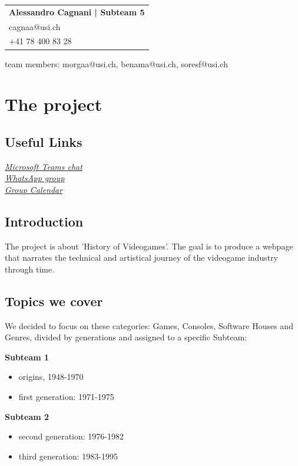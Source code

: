 \documentclass[a4paper,10pt]{article}
\newcommand{\idcard}[3]{
    \vspace{-0.3cm}
    \begin{table}[h!]
     \begin{tabular}{|l|}
        \hline
        \textbf{#1} \\
        #2 \\
        #3\\
        \hline
     \end{tabular}
    \end{table}
    \vspace{-0.3cm}
}
\newcommand{\link}[2]{
    \href{#2}{\textit{\underline{#1}}}\\
}
\begin{document}
        \idcard{Alessandro Cagnani | \textbf{Subteam 5}}{cagnaa@usi.ch}{+41 78 400 83 28}
        team members: morgaa@usi.ch, benama@usi.ch, soresf@usi.ch\newline
\newpage

\section{The project}
    \subsection{Useful Links}
        \link{Microsoft Teams chat}{https://teams.microsoft.com/l/team19\%3aee0d65826e13406983df3773a93b52a2\%40thread.tacv2/conversations?groupId=675cd029-770b-4bdb-bbfc-6ea78473d809&tenantId=95bdc5ac-afb5-4881-801b-3874f365cd6f}
        \link{WhatsApp group}{https://chat.whatsapp.com/Kf9MN7y5BQ6L7svmkolKC9}
        \link{Group Calendar}{https://outlook.office.com/calendar/group/group.university/sa1g1p/view/month}
    \vspace{-0.6cm}
    \subsection{Introduction}
        The project is about 'History of Videogames'. The goal is to produce a webpage that narrates the technical and artistical journey of the videogame industry through time.
    
    
    \subsection{Topics we cover}
    We decided to focus on these categories: Games, Consoles, Software Houses and Genres, divided by generations and assigned to a specific Subteam:
    
     \textbf{Subteam 1}
     \vspace{-0.3cm}
     \begin{itemize}
     \item origins, 1948-1970
     \vspace{-0.3cm}
     \item first generation: 1971-1975
     \end{itemize}
     
     \textbf{Subteam 2}
     \vspace{-0.3cm}
     \begin{itemize}
     \item second generation: 1976-1982
     \vspace{-0.3cm}
     \item third generation: 1983-1995
     \end{itemize}
     
\end{document}
